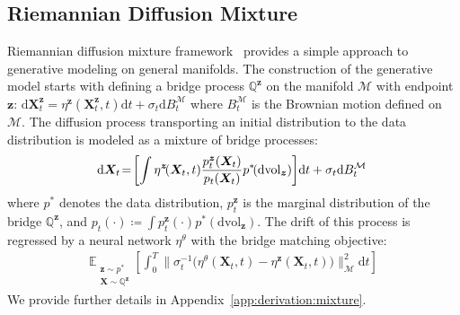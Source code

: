 \subsection{Riemannian Diffusion Mixture}
Riemannian diffusion mixture framework~\citep{jo2024riemannian} provides a simple approach to generative modeling on general manifolds.
The construction of the generative model starts with defining a bridge process $\mathbb{Q}^{\bm{z}}$ on the manifold $\mathcal{M}$ with endpoint $\bm{z}$: $\mathrm{d}\bm{X}^{\bm{z}}_t = \eta^{\bm{z}}(\bm{X}^{\bm{z}}_t,t)\mathrm{d}t + \sigma_t\mathrm{d}B^{\mathcal{M}}_t$ where $B^{\mathcal{M}}_t$ is the Brownian motion defined on $\mathcal{M}$.
The diffusion process transporting an initial distribution to the data distribution is modeled as a mixture of bridge processes: 
\begin{align}
\hspace{-1mm}
    \mathrm{d}\bm{X}_t \!=\! \left[ 
        \int \eta^{\bm{z}}\!(\bm{X}_t,t) \frac{p^{\bm{z}}_t(\bm{X}_t)}{p_t(\bm{X}_t)} p^{\ast}\!(\mathrm{d}\text{vol}_{\bm{z}}) 
    \right] \!\mathrm{d}t + \sigma_t \mathrm{d}B^{\mathcal{M}}_t
\end{align}
where $p^{\ast}$ denotes the data distribution, $p^{\bm{z}}_t$ is the marginal distribution of the bridge $\mathbb{Q}^{\bm{z}}$, and $p_t(\cdot)\coloneqq \int p^{\bm{z}}_t(\cdot) p^{\ast}\!(\mathrm{d}\text{vol}_{\bm{z}})$.
The drift of this process is regressed by a neural network $\eta^{\theta}$ with the bridge matching objective:
\begin{align}
    \mathbb{E}_{\substack{\bm{z}\sim  p^{\ast} \\ \bm{X}\sim\mathbb{Q}^{\bm{z}}}}\! \left[
        \int^T_0 \Big\|
            \sigma^{-1}_t \Big(\eta^{\theta}(\bm{X}_t,t) - \eta^{\bm{z}} (\bm{X}_t,t) \Big)
        \Big\|^2_{\mathcal{M}}\mathrm{d}t
    \right]
\end{align}
We provide further details in Appendix~\ref{app:derivation:mixture}.